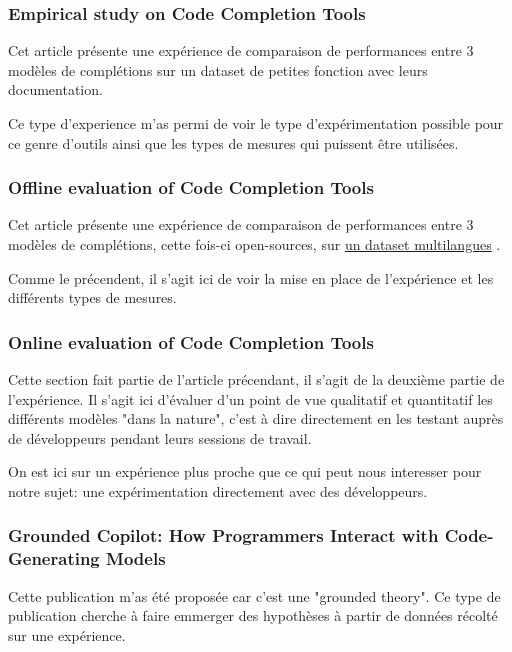 \subsubsection{Empirical study on Code Completion Tools \cite{evalcodecompquality}}

Cet article présente une expérience de comparaison de performances entre
3 modèles de complétions sur un dataset de petites fonction avec leurs documentation.

Ce type d'experience m'as permi de voir le type d'expérimentation possible pour ce genre d'outils ainsi que
les types de mesures qui puissent être utilisées.


\subsubsection{Offline evaluation of Code Completion Tools \cite{llm-online-offline}}

Cet article présente une expérience de comparaison de performances entre
3 modèles de complétions, cette fois-ci open-sources, sur \href{https://github.com/VHellendoorn/Code-LMs#datasets}{un dataset multilangues} \cite{dataset-code-lm}.

Comme le précendent, il s'agit ici de voir la mise en place de l'expérience et les différents types de mesures.


\subsubsection{Online evaluation of Code Completion Tools \cite{llm-online-offline}}

Cette section fait partie de l'article précendant, il s'agit de la deuxième partie de l'expérience.
Il s'agit ici d'évaluer d'un point de vue qualitatif et quantitatif les différents modèles "dans la nature",
c'est à dire directement en les testant auprès de développeurs pendant leurs sessions de travail.

On est ici sur un expérience plus proche que ce qui peut nous interesser pour notre sujet: une expérimentation directement avec des développeurs.


\subsubsection{Grounded Copilot: How Programmers Interact with Code-Generating Models \cite{grouded}}

Cette publication m'as été proposée car c'est une "grounded theory".
Ce type de publication cherche à faire emmerger des hypothèses à partir de données récolté sur une expérience.

